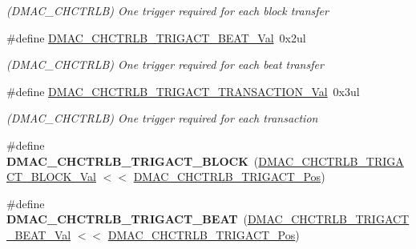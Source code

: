 \begin{DoxyCompactItemize}
\begin{DoxyCompactList}\small\item\em (D\+M\+A\+C\+\_\+\+C\+H\+C\+T\+R\+L\+B) One trigger required for each block transfer \end{DoxyCompactList}\item 
\hypertarget{group___s_a_m_l21___d_m_a_c_ga5ef24f993615ff0560e51bb28f2b630f}{}\#define \hyperlink{group___s_a_m_l21___d_m_a_c_ga5ef24f993615ff0560e51bb28f2b630f}{D\+M\+A\+C\+\_\+\+C\+H\+C\+T\+R\+L\+B\+\_\+\+T\+R\+I\+G\+A\+C\+T\+\_\+\+B\+E\+A\+T\+\_\+\+Val}~0x2ul\label{group___s_a_m_l21___d_m_a_c_ga5ef24f993615ff0560e51bb28f2b630f}

\begin{DoxyCompactList}\small\item\em (D\+M\+A\+C\+\_\+\+C\+H\+C\+T\+R\+L\+B) One trigger required for each beat transfer \end{DoxyCompactList}\item 
\hypertarget{group___s_a_m_l21___d_m_a_c_gab0c773cec6c091dc3bb20e4ccf5699c6}{}\#define \hyperlink{group___s_a_m_l21___d_m_a_c_gab0c773cec6c091dc3bb20e4ccf5699c6}{D\+M\+A\+C\+\_\+\+C\+H\+C\+T\+R\+L\+B\+\_\+\+T\+R\+I\+G\+A\+C\+T\+\_\+\+T\+R\+A\+N\+S\+A\+C\+T\+I\+O\+N\+\_\+\+Val}~0x3ul\label{group___s_a_m_l21___d_m_a_c_gab0c773cec6c091dc3bb20e4ccf5699c6}

\begin{DoxyCompactList}\small\item\em (D\+M\+A\+C\+\_\+\+C\+H\+C\+T\+R\+L\+B) One trigger required for each transaction \end{DoxyCompactList}\item 
\hypertarget{group___s_a_m_l21___d_m_a_c_ga6ee6ddba68d195a73a2dfb4010308f03}{}\#define {\bfseries D\+M\+A\+C\+\_\+\+C\+H\+C\+T\+R\+L\+B\+\_\+\+T\+R\+I\+G\+A\+C\+T\+\_\+\+B\+L\+O\+C\+K}~(\hyperlink{group___s_a_m_l21___d_m_a_c_gaa54bf830756309b4ec082836357fc93f}{D\+M\+A\+C\+\_\+\+C\+H\+C\+T\+R\+L\+B\+\_\+\+T\+R\+I\+G\+A\+C\+T\+\_\+\+B\+L\+O\+C\+K\+\_\+\+Val} $<$$<$ \hyperlink{group___s_a_m_l21___d_m_a_c_gaada77814aa3858a4b49aabef88429c31}{D\+M\+A\+C\+\_\+\+C\+H\+C\+T\+R\+L\+B\+\_\+\+T\+R\+I\+G\+A\+C\+T\+\_\+\+Pos})\label{group___s_a_m_l21___d_m_a_c_ga6ee6ddba68d195a73a2dfb4010308f03}

\item 
\hypertarget{group___s_a_m_l21___d_m_a_c_gaf1130302a7e395b8947651d59967951a}{}\#define {\bfseries D\+M\+A\+C\+\_\+\+C\+H\+C\+T\+R\+L\+B\+\_\+\+T\+R\+I\+G\+A\+C\+T\+\_\+\+B\+E\+A\+T}~(\hyperlink{group___s_a_m_l21___d_m_a_c_ga5ef24f993615ff0560e51bb28f2b630f}{D\+M\+A\+C\+\_\+\+C\+H\+C\+T\+R\+L\+B\+\_\+\+T\+R\+I\+G\+A\+C\+T\+\_\+\+B\+E\+A\+T\+\_\+\+Val} $<$$<$ \hyperlink{group___s_a_m_l21___d_m_a_c_gaada77814aa3858a4b49aabef88429c31}{D\+M\+A\+C\+\_\+\+C\+H\+C\+T\+R\+L\+B\+\_\+\+T\+R\+I\+G\+A\+C\+T\+\_\+\+Pos})\label{group___s_a_m_l21___d_m_a_c_gaf1130302a7e395b8947651d59967951a}


\end{DoxyCompactItemize}
